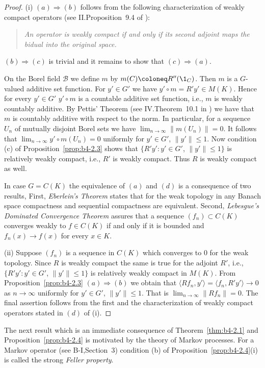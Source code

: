 \begin{proof}
	(i) $(a)\Rightarrow(b)$ follows from the following characterization of
	weakly compact operators (see \eg II.Proposition~9.4 of \citet{schaefer:1974}):
	\begin{quote}
		\emph{
			An operator is weakly compact if and only if its second adjoint
		maps the bidual into the original space.
		}
	\end{quote}
	$(b)\Rightarrow(c)$ is trivial and it remains to show that $(c) \Rightarrow (a)$.
	
	On the Borel field $\mathcal{B}$ we define $m$ by $m(C)  \coloneq  R''(\1_C)$.
	Then $m$ is
	a $G$-valued additive set function.
	For $y' \in G'$ we have
	$y'\circ m = R'y' \in M(K)$.
	Hence for every $y' \in G'$ $y'\circ m$ is a countable
	additive set function, i.e., $m$ is weakly countably additive.
	By
	Pettis' Theorem (see IV.Theorem~10.1 in 
	\citet{dunfordschwartz:1958}) we have
	that $m$ is countably additive with respect to the norm.
	In particular, for a sequence $U_n$ of mutually disjoint Borel sets we have
	$\lim_{n\to\infty}\|m(U_n)\| = 0$.
	It follows that $\lim_{n\to\infty}y'\circ m(U_n) = 0$ uniformly for
	$y' \in G'$, $\|y'\| \leq 1$.
	Now condition (c) of Proposition~\ref{prop:b4-2.3} shows that $\{R'y'
	\colon y' \in G'$, $\|y'\| \leq 1\}$ is relatively weakly compact, i.e., $R'$ is
	weakly compact.
	Thus $R$ is weakly compact as well.
	
	In case $G = C(K)$ the equivalence of $(a)$ and $(d)$ is a consequence of
	two results, First, \emph{Eberlein's Theorem} states that for the weak topology in any Banach space compactness and sequential compactness are
	equivalent.
	Second, \emph{Lebesgue's Dominated Convergence Theorem} assures
	that a sequence $(f_n) \subset C(K)$ converges weakly to $f \in C(K)$ if and
	only if it is bounded and $f_n(x) \to f(x)$ for every $x \in K$.
	
	(ii) Suppose $(f_n)$ is a sequence in $C(K)$ which converges to $0$ for
	the weak topology.
	Since $R$ is weakly compact the same is true for
	the adjoint $R'$, i.e., $\{R'y' \colon y' \in G'$, $\|y'\| \leq 1\}$ is relatively
	weakly compact in $M(K)$.
	From Proposition~\ref{prop:b4-2.3} $(a)\Rightarrow(b)$ we obtain that
	$\langle Rf_n,y'\rangle = \langle f_n,R'y'\rangle \to 0$ as $n \to \infty$ uniformly for $y' \in G'$, $\|y'\|\leq1$.
	That is $\lim_{n\to\infty}\|Rf_n\| = 0$.
	The final assertion follows from the first and the characterization of
	weakly compact operators stated in $(d)$ of (i).
\end{proof}
%
%
%
\newpage
%
The next result which is an immediate consequence of Theorem~\ref{thm:b4-2.1} and
Proposition~\ref{prop:b4-2.4} is motivated by the theory of Markov processes.
For a Markov
operator (see B-I,Section~3) condition (b) of Proposition~\ref{prop:b4-2.4}(i) is called the
strong \emph{Feller property}.

